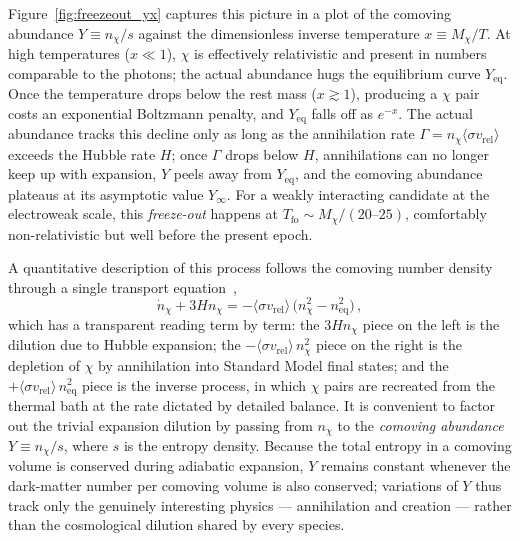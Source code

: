 Figure~\ref{fig:freezeout_yx} captures this picture in a plot of the comoving abundance $Y \equiv n_\chi/s$ against the dimensionless inverse temperature $x \equiv M_\chi/T$.
At high temperatures ($x \ll 1$), $\chi$ is effectively relativistic and present in numbers comparable to the photons; the actual abundance hugs the equilibrium curve $Y_\mathrm{eq}$.
Once the temperature drops below the rest mass ($x \gtrsim 1$), producing a $\chi$ pair costs an exponential Boltzmann penalty, and $Y_\mathrm{eq}$ falls off as $e^{-x}$.
The actual abundance tracks this decline only as long as the annihilation rate $\Gamma = n_\chi \langle \sigma v_\mathrm{rel}\rangle$ exceeds the Hubble rate $H$; once $\Gamma$ drops below $H$, annihilations can no longer keep up with expansion, $Y$ peels away from $Y_\mathrm{eq}$, and the comoving abundance plateaus at its asymptotic value $Y_\infty$.
For a weakly interacting candidate at the electroweak scale, this \emph{freeze-out} happens at $T_\mathrm{fo} \sim M_\chi/(20\text{--}25)$, comfortably non-relativistic but well before the present epoch.

A quantitative description of this process follows the comoving number density through a single transport equation~\cite{Gondolo:1990dk,Cirelli:2024ssz},
\begin{equation}
	\dot n_\chi + 3 H n_\chi = -\langle \sigma v_\mathrm{rel} \rangle\, \bigl( n_\chi^2 - n_\mathrm{eq}^2 \bigr)\,,
	\label{eq:boltzmann}
\end{equation}
which has a transparent reading term by term: the $3 H n_\chi$ piece on the left is the dilution due to Hubble expansion; the $-\langle \sigma v_\mathrm{rel}\rangle\, n_\chi^2$ piece on the right is the depletion of $\chi$ by annihilation into Standard Model final states; and the $+\langle \sigma v_\mathrm{rel}\rangle\, n_\mathrm{eq}^2$ piece is the inverse process, in which $\chi$ pairs are recreated from the thermal bath at the rate dictated by detailed balance.
It is convenient to factor out the trivial expansion dilution by passing from $n_\chi$ to the \emph{comoving abundance} $Y \equiv n_\chi / s$, where $s$ is the entropy density.
Because the total entropy in a comoving volume is conserved during adiabatic expansion, $Y$ remains constant whenever the dark-matter number per comoving volume is also conserved; variations of $Y$ thus track only the genuinely interesting physics --- annihilation and creation --- rather than the cosmological dilution shared by every species.

